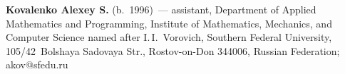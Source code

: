 \vspace*{-12pt}


\Contrl

\vspace*{-3pt}


\noindent 
\textbf{Kovalenko Alexey S.} (b.\ 1996)~--- assistant, Department of Applied Mathematics and Programming, 
Institute of Mathematics, Mechanics, and Computer Science named after I.\,I.~Vorovich, 
Southern Federal University, 105/42~Bolshaya Sadovaya Str., Rostov-on-Don 344006, Russian Federation; 
\mbox{akov@sfedu.ru}




\label{end\stat}

\renewcommand{\bibname}{\protect\rm Литература} 
